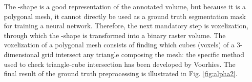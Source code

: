 The \textalpha-shape is a good representation of the annotated volume, but
because it is a polygonal mesh, it cannot directly be used as a ground truth
segmentation mask for training a neural network. Therefore, the next mandatory
step is voxelization, through which the \textalpha-shape is transformed into
a binary raster volume. The voxelization of a polygonal mesh consists of finding
which cubes (voxels) of a 3-dimensional grid intersect any triangle composing
the mesh: the specific method used to check triangle-cube intersection has been
developed by Voorhies. The final result of the ground truth preprocessing is
illustrated in Fig. \ref{fig:alpha2}.

